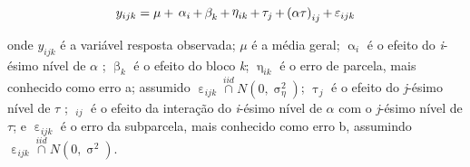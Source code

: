 \documentclass[
]{book}
\begin{document}
\[
{y_{ijk}} = {\rm{ }}\mu {\rm{ }} + {\rm{ }}\mathop \alpha \nolimits_i + \mathop \beta \nolimits_{k} + \mathop \eta \nolimits_{ik}  +\mathop \tau \nolimits_j  + \mathop {(\alpha \tau )}\nolimits_{ij}  + {\rm{ }}\mathop \varepsilon \nolimits_{ijk}
\]

onde \({y_{ijk}}\) é a variável resposta observada; \(\mu\) é a média geral; \(\mathop \alpha \nolimits_i\) é o efeito do \emph{i}-ésimo nível de \(\alpha\) ; \(\mathop \beta \nolimits_{k}\) é o efeito do bloco \emph{k}; \(\mathop \eta \nolimits_{ik}\) é o erro de parcela, mais conhecido como erro a; assumido \(\mathop \varepsilon \nolimits_{ijk} \mathop \cap \limits^{iid} N(0,\mathop \sigma \nolimits_\eta^2 )\); \(\mathop \tau \nolimits_j\) é o efeito do \emph{j}-ésimo nível de \(\tau\) ; \(\mathop {(\alpha \tau )}\nolimits_{ij}\) é o efeito da interação do \emph{i}-ésimo nível de \(\alpha\) com o \emph{j}-ésimo nível de \(\tau\); e \(\mathop \varepsilon \nolimits_{ijk}\) é o erro da subparcela, mais conhecido como erro b, assumindo \(\mathop \varepsilon \nolimits_{ijk} \mathop \cap \limits^{iid} N(0,\mathop \sigma \nolimits^2 )\).
\end{document}
